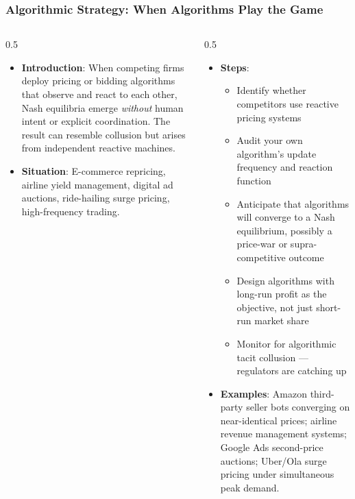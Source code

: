 \begin{frame}[fragile]\frametitle{Algorithmic Strategy: When Algorithms Play the Game}
\begin{columns}
    \begin{column}[T]{0.5\linewidth}
      \begin{itemize}
        \item \textbf{Introduction}: When competing firms deploy pricing or bidding
          algorithms that observe and react to each other, Nash equilibria
          emerge \textit{without} human intent or explicit coordination.
          The result can resemble collusion but arises from independent
          reactive machines.
        \item \textbf{Situation}: E-commerce repricing, airline yield management,
          digital ad auctions, ride-hailing surge pricing,
          high-frequency trading.
      \end{itemize}
    \end{column}
    \begin{column}[T]{0.5\linewidth}
      \begin{itemize}
        \item \textbf{Steps}:
        \begin{itemize}
          \item Identify whether competitors use reactive pricing systems
          \item Audit your own algorithm's update frequency and reaction function
          \item Anticipate that algorithms will converge to a Nash equilibrium,
            possibly a price-war or supra-competitive outcome
          \item Design algorithms with long-run profit as the objective,
            not just short-run market share
          \item Monitor for algorithmic tacit collusion --- regulators are catching up
        \end{itemize}
        \item \textbf{Examples}: Amazon third-party seller bots converging on
          near-identical prices; airline revenue management systems; Google Ads
          second-price auctions; Uber/Ola surge pricing under simultaneous peak demand.
      \end{itemize}
    \end{column}
  \end{columns}
\end{frame}


